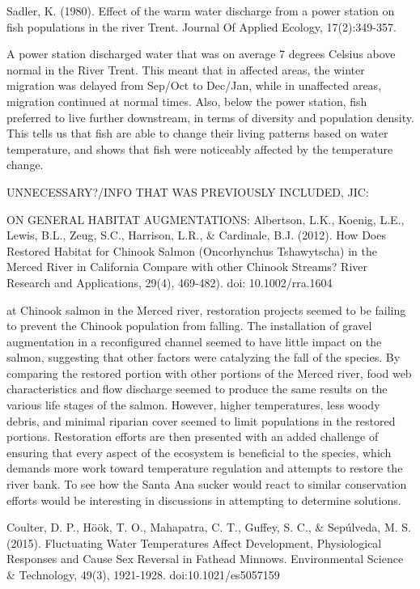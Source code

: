 \documentclass{article}\usepackage[]{graphicx}\usepackage[]{color}
\begin{document}
Sadler, K. (1980). Effect of the warm water discharge from a power station on fish populations in the river Trent. Journal Of Applied Ecology, 17(2):349-357.

\citep{sadler1980effect}

A power station discharged water that was on average 7 degrees Celsius above normal in the River Trent. This meant that in affected areas, the winter migration was delayed from Sep/Oct to Dec/Jan, while in unaffected areas, migration continued at normal times. Also, below the power station, fish preferred to live further downstream, in terms of diversity and population density. This tells us that fish are able to change their living patterns based on water temperature, and shows that fish were noticeably affected by the temperature change. 


UNNECESSARY?/INFO THAT WAS PREVIOUSLY INCLUDED, JIC:

ON GENERAL HABITAT AUGMENTATIONS: Albertson, L.K., Koenig, L.E., Lewis, B.L., Zeug, S.C., Harrison, L.R., \& Cardinale, B.J. (2012). How Does Restored Habitat for Chinook Salmon (Oncorhynchus Tshawytscha) in the Merced River in California Compare with other Chinook Streams? River Research and Applications, 29(4), 469-482). doi: 10.1002/rra.1604

at Chinook salmon in the Merced river, restoration projects seemed to be failing to prevent the Chinook population from falling. The installation of gravel augmentation in a reconfigured channel seemed to have little impact on the salmon, suggesting that other factors were catalyzing the fall of the species. 
By comparing the restored portion with other portions of the Merced river, food web characteristics and flow discharge seemed to produce the same results on the various life stages of the salmon. However, higher temperatures, less woody debris, and minimal riparian cover seemed to limit populations in the restored portions. 
Restoration efforts are then presented with an added challenge of ensuring that every aspect of the ecosystem is beneficial to the species, which demands more work toward temperature regulation and attempts to restore the river bank. 
To see how the Santa Ana sucker would react to similar conservation efforts would be interesting in discussions in attempting to determine solutions. 

Coulter, D. P., Höök, T. O., Mahapatra, C. T., Guffey, S. C., \& Sepúlveda, M. S. (2015). Fluctuating Water Temperatures Affect Development, Physiological Responses and Cause Sex Reversal in Fathead Minnows. Environmental Science \& Technology, 49(3), 1921-1928. doi:10.1021/es5057159
\end{document}
